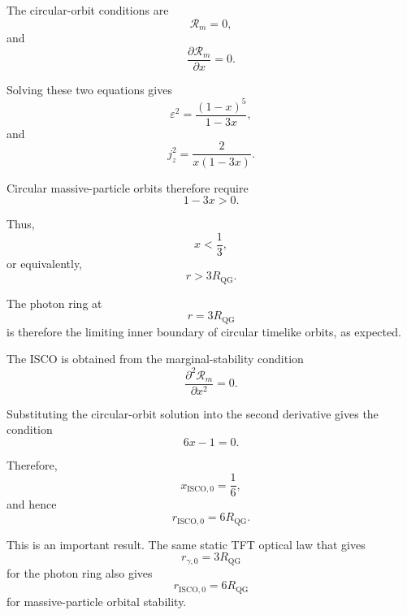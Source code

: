 The circular-orbit conditions are
\begin{equation}
    \mathcal{R}_m = 0,
\end{equation}
and
\begin{equation}
    \frac{\partial \mathcal{R}_m}{\partial x} = 0.
\end{equation}

Solving these two equations gives
\begin{equation}
    \varepsilon^2 = \frac{(1-x)^5}{1-3x},
\end{equation}
and
\begin{equation}
    j_z^2 = \frac{2}{x(1-3x)}.
\end{equation}

Circular massive-particle orbits therefore require
\begin{equation}
    1-3x > 0.
\end{equation}

Thus,
\begin{equation}
    x < \frac{1}{3},
\end{equation}
or equivalently,
\begin{equation}
    r > 3R_{\mathrm{QG}}.
\end{equation}

The photon ring at
\begin{equation}
    r = 3R_{\mathrm{QG}}
\end{equation}
is therefore the limiting inner boundary of circular timelike orbits, as expected.

The ISCO is obtained from the marginal-stability condition
\begin{equation}
    \frac{\partial^2\mathcal{R}_m}{\partial x^2} = 0.
\end{equation}

Substituting the circular-orbit solution into the second derivative gives the condition
\begin{equation}
    6x - 1 = 0.
\end{equation}

Therefore,
\begin{equation}
    x_{\mathrm{ISCO},0} = \frac{1}{6},
\end{equation}
and hence
\begin{equation}
    \boxed{ r_{\mathrm{ISCO},0} = 6R_{\mathrm{QG}}. }
\end{equation}

This is an important result. The same static TFT optical law that gives
\begin{equation}
    r_{\gamma,0} = 3R_{\mathrm{QG}}
\end{equation}
for the photon ring also gives
\begin{equation}
    r_{\mathrm{ISCO},0} = 6R_{\mathrm{QG}}
\end{equation}
for massive-particle orbital stability.

